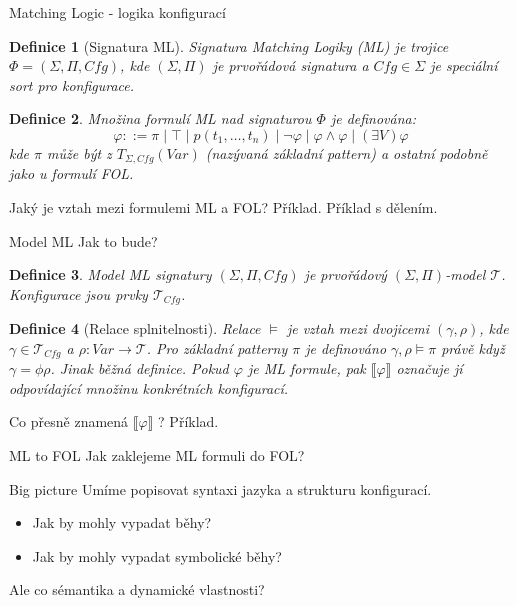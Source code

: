 \documentclass[11pt]{beamer}
\newtheorem{dfn}{Definice}
\newcommand{\Var}{\mathit{Var}}
\newcommand{\folSignature}{\ensuremath{\left( \Sigma, \Pi \right)}}
\newcommand{\mlSignature}{\ensuremath{\left( \Sigma, \Pi, \mathit{Cfg} \right)}}
\newcommand{\Tcfg}{\ensuremath{\mathcal{T}_{\mathit{Cfg}}}}
\begin{document}
\begin{frame}{Matching Logic - logika konfigurací}


\begin{dfn}[Signatura ML]
Signatura Matching Logiky (ML) je trojice $\Phi = \mlSignature$,
kde $\left( \Sigma, \Pi \right)$ je prvořádová signatura a $\mathit{Cfg} \in \Sigma$ je speciální sort pro konfigurace.
\end{dfn}

\pause

\begin{dfn}
Množina formulí ML nad signaturou $\Phi$ je definována:
\begin{equation*}
\varphi ::= \pi \mid \top \mid p(t_1,\ldots,t_n) \mid \neg \varphi \mid \varphi \land \varphi \mid \left( \exists V \right) \varphi
\end{equation*}
kde $\pi$ může být z $T_{\Sigma, \mathit{Cfg}}\left( Var \right)$ (nazývaná základní pattern) a ostatní podobně jako u formulí FOL.
\end{dfn}

\pause
Jaký je vztah mezi formulemi ML a FOL?
\pause
Příklad.
\pause
Příklad s dělením.

\end{frame}

\begin{frame}{Model ML}
Jak to bude?
\pause
\begin{dfn}
Model ML signatury $\mlSignature$ je prvořádový $\folSignature$-model $\mathcal{T}$. Konfigurace jsou prvky $\Tcfg$.
\end{dfn}

\pause

\begin{dfn}[Relace splnitelnosti]
Relace $\models$ je vztah mezi dvojicemi $\left( \gamma, \rho \right)$, kde $\gamma \in \Tcfg$
a $\rho : \Var \rightarrow \mathcal{T}$. Pro základní patterny $\pi$ je definováno $\gamma, \rho \models \pi$ právě když $\gamma = \phi \rho$. Jinak běžná definice. Pokud $\varphi$ je ML formule, pak $\llbracket \varphi \rrbracket$ označuje jí odpovídající množinu konkrétních konfigurací.
\end{dfn}
\pause
Co přesně znamená $\llbracket \varphi \rrbracket$ ?
\pause
Příklad.
\end{frame}

\begin{frame}{ML to FOL}
Jak zaklejeme ML formuli do FOL?
\end{frame}


\begin{frame}{Big picture}
Umíme popisovat syntaxi jazyka a strukturu konfigurací.
\begin{itemize}
\pause \item Jak by mohly vypadat běhy?
\pause \item Jak by mohly vypadat symbolické běhy?
\end{itemize}

\pause
Ale co sémantika a dynamické vlastnosti?
\end{frame}
\end{document}
